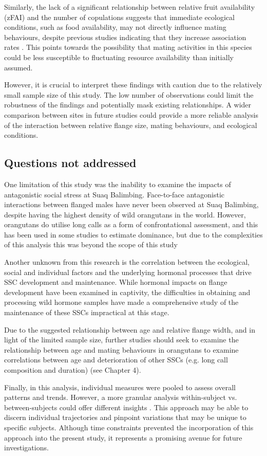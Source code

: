 Similarly, the lack of a significant relationship between relative fruit availability (zFAI) and the number of copulations suggests that immediate ecological conditions, such as food availability, may not directly influence mating behaviours, despite previous studies indicating that they increase association rates \citep{Marshall.2008}. This points towards the possibility that mating activities in this species could be less susceptible to fluctuating resource availability than initially assumed.

However, it is crucial to interpret these findings with caution due to the relatively small sample size of this study. The low number of observations could limit the robustness of the findings and potentially mask existing relationships. A wider comparison between sites in future studies could provide a more reliable analysis of the interaction between relative flange size, mating behaviours, and ecological conditions.

\subsection{Questions not addressed}

One limitation of this study was the inability to examine the impacts of antagonistic social stress at Suaq Balimbing. Face-to-face antagonistic interactions between flanged males have never been observed at Suaq Balimbing, despite having the highest density of wild orangutans in the world. However, orangutans do utilise long calls as a form of confrontational assessment, and this has been used in some studies to estimate dominance, but due to the complexities of this analysis this was beyond the scope of this study \citep{Spillmann.2016}

Another unknown from this research is the correlation between the ecological, social and individual factors and the underlying hormonal processes that drive SSC development and maintenance. While hormonal impacts on flange development have been examined in captivity, the difficulties in obtaining and processing wild hormone samples have made a comprehensive study of the maintenance of these SSCs impractical at this stage.

Due to the suggested relationship between age and relative flange width, and in light of the limited sample size, further studies should seek to examine the relationship between age and mating behaviours in orangutans to examine correlations between age and deterioration of other SSCs (e.g. long call composition and duration) (see Chapter 4).

Finally, in this analysis, individual measures were pooled to assess overall patterns and trends. However, a more granular analysis within-subject vs. between-subjects could offer different insights \citep{Siracusa.2022}. This approach may be able to discern individual trajectories and pinpoint variations that may be unique to specific subjects. Although time constraints prevented the incorporation of this approach into the present study, it represents a promising avenue for future investigations. 

